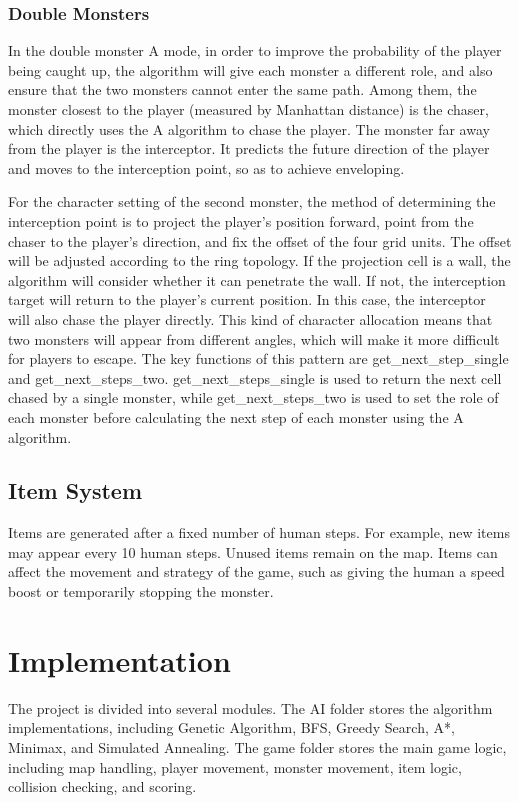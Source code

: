 \documentclass[12pt,a4paper]{article}
\begin{document}
\subsubsection{Double Monsters}
In the double monster A\* mode, in order to improve the probability of the player being caught up, the algorithm will give each monster a different role, and also ensure that the two monsters cannot enter the same path. Among them, the monster closest to the player (measured by Manhattan distance) is the chaser, which directly uses the A\* algorithm to chase the player. The monster far away from the player is the interceptor. It predicts the future direction of the player and moves to the interception point, so as to achieve enveloping. 

For the character setting of the second monster, the method of determining the interception point is to project the player's position forward, point from the chaser to the player's direction, and fix the offset of the four grid units. The offset will be adjusted according to the ring topology. If the projection cell is a wall, the algorithm will consider whether it can penetrate the wall. If not, the interception target will return to the player's current position. In this case, the interceptor will also chase the player directly. This kind of character allocation means that two monsters will appear from different angles, which will make it more difficult for players to escape. The key functions of this pattern are get\_next\_step\_single and get\_next\_steps\_two. get\_next\_steps\_single is used to return the next cell chased by a single monster, while get\_next\_steps\_two is used to set the role of each monster before calculating the next step of each monster using the A\* algorithm.
\subsection{Item System}

Items are generated after a fixed number of human steps. For example, new items may appear every 10 human steps. Unused items remain on the map. Items can affect the movement and strategy of the game, such as giving the human a speed boost or temporarily stopping the monster.

\section{Implementation}

The project is divided into several modules. The AI folder stores the algorithm implementations, including Genetic Algorithm, BFS, Greedy Search, A*, Minimax, and Simulated Annealing. The game folder stores the main game logic, including map handling, player movement, monster movement, item logic, collision checking, and scoring.
\end{document}
